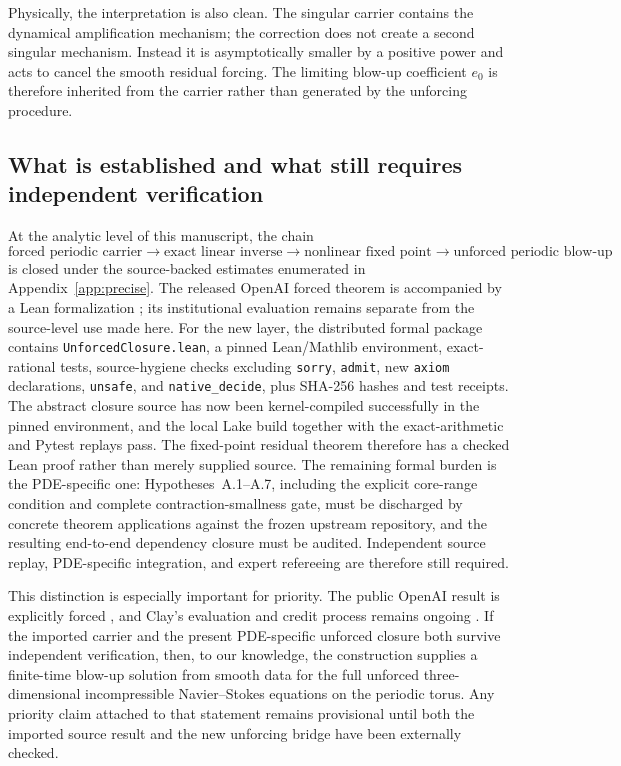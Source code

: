 \documentclass[11pt]{article}
\numberwithin{equation}{section}
\begin{document}
Physically, the interpretation is also clean.  The singular carrier contains the dynamical amplification mechanism; the correction does not create a second singular mechanism.  Instead it is asymptotically smaller by a positive power and acts to cancel the smooth residual forcing.  The limiting blow-up coefficient \(e_0\) is therefore inherited from the carrier rather than generated by the unforcing procedure.

\subsection{What is established and what still requires independent verification}
At the analytic level of this manuscript, the chain
\[
\text{forced periodic carrier}
\longrightarrow
\text{exact linear inverse}
\longrightarrow
\text{nonlinear fixed point}
\longrightarrow
\text{unforced periodic blow-up}
\]
is closed under the source-backed estimates enumerated in Appendix~\ref{app:precise}.  The released OpenAI forced theorem is accompanied by a Lean formalization \cite{OpenAIRepo2026}; its institutional evaluation remains separate from the source-level use made here.  For the new layer, the distributed formal package contains \texttt{UnforcedClosure.lean}, a pinned Lean/Mathlib environment, exact-rational tests, source-hygiene checks excluding \texttt{sorry}, \texttt{admit}, new \texttt{axiom} declarations, \texttt{unsafe}, and \texttt{native\_decide}, plus SHA-256 hashes and test receipts.  The abstract closure source has now been kernel-compiled successfully in the pinned environment, and the local Lake build together with the exact-arithmetic and Pytest replays pass.  The fixed-point residual theorem therefore has a checked Lean proof rather than merely supplied source.  The remaining formal burden is the PDE-specific one: Hypotheses~A.1--A.7, including the explicit core-range condition and complete contraction-smallness gate, must be discharged by concrete theorem applications against the frozen upstream repository, and the resulting end-to-end dependency closure must be audited.  Independent source replay, PDE-specific integration, and expert refereeing are therefore still required.

This distinction is especially important for priority.  The public OpenAI result is explicitly forced \cite{OpenAI2026NS,OpenAIRepo2026}, and Clay's evaluation and credit process remains ongoing \cite{ClayAnnouncement2026}.  If the imported carrier and the present PDE-specific unforced closure both survive independent verification, then, to our knowledge, the construction supplies a finite-time blow-up solution from smooth data for the full unforced three-dimensional incompressible Navier--Stokes equations on the periodic torus.  Any priority claim attached to that statement remains provisional until both the imported source result and the new unforcing bridge have been externally checked.
\end{document}

